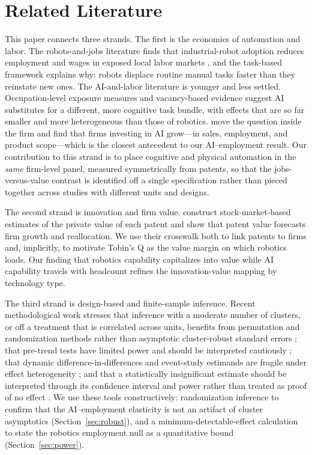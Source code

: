 \documentclass[12pt]{article}
\begin{document}
\section{Related Literature}\label{sec:lit}
This paper connects three strands. The first is the economics of automation and labor. The
robots-and-jobs literature finds that industrial-robot adoption reduces employment and wages in
exposed local labor markets \citep{acemoglu2020,graetz2018}, and the task-based framework
\citep{acemoglu2022,autor2015} explains why: robots displace routine manual tasks faster than
they reinstate new ones. The AI-and-labor literature is younger and less settled. Occupation-level
exposure measures \citep{webb2020} and vacancy-based evidence \citep{acemoglu2022} suggest AI
substitutes for a different, more cognitive task bundle, with effects that are so far smaller and
more heterogeneous than those of robotics. \citet{babina2024} move the question inside the firm
and find that firms investing in AI grow---in sales, employment, and product scope---which is the
closest antecedent to our AI--employment result. Our contribution to this strand is to place
cognitive and physical automation in the \emph{same} firm-level panel, measured symmetrically
from patents, so that the jobs-versus-value contrast is identified off a single specification
rather than pieced together across studies with different units and designs.

The second strand is innovation and firm value. \citet{kpss2017} construct stock-market-based
estimates of the private value of each patent and show that patent value forecasts firm growth
and reallocation. We use their crosswalk both to link patents to firms and, implicitly, to
motivate Tobin's Q as the value margin on which robotics loads. Our finding that robotics
capability capitalizes into value while AI capability travels with headcount refines the
innovation-value mapping by technology type.

The third strand is design-based and finite-sample inference. Recent methodological work stresses
that inference with a moderate number of clusters, or off a treatment that is correlated across
units, benefits from permutation and randomization methods rather than asymptotic cluster-robust
standard errors \citep{young2019}; that pre-trend tests have limited power and should be
interpreted cautiously \citep{roth2022}; that dynamic difference-in-differences and event-study
estimands are fragile under effect heterogeneity \citep{callaway2021}; and that a statistically
insignificant estimate should be interpreted through its confidence interval and power rather than
treated as proof of no effect \citep{abadie2020}. We use these tools constructively: randomization
inference to confirm that the AI--employment elasticity is not an artifact of cluster asymptotics
(Section~\ref{sec:robust}), and a minimum-detectable-effect calculation to state the robotics
employment null as a quantitative bound (Section~\ref{sec:power}).
\end{document}
